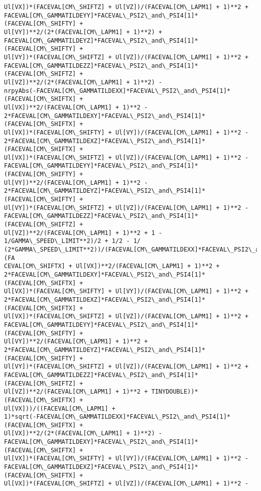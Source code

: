 \documentclass[landscape,letterpaper,10pt,english]{article}
\begin{document}
\begin{Verbatim}[commandchars=\\\{\}]
Ul[VX])*(FACEVAL[CM\_SHIFTZ] + Ul[VZ])/(FACEVAL[CM\_LAPM1] + 1)**2 +
FACEVAL[CM\_GAMMATILDEYY]*FACEVAL\_PSI2\_and\_PSI4[1]*(FACEVAL[CM\_SHIFTY] +
Ul[VY])**2/(2*(FACEVAL[CM\_LAPM1] + 1)**2) +
FACEVAL[CM\_GAMMATILDEYZ]*FACEVAL\_PSI2\_and\_PSI4[1]*(FACEVAL[CM\_SHIFTY] +
Ul[VY])*(FACEVAL[CM\_SHIFTZ] + Ul[VZ])/(FACEVAL[CM\_LAPM1] + 1)**2 +
FACEVAL[CM\_GAMMATILDEZZ]*FACEVAL\_PSI2\_and\_PSI4[1]*(FACEVAL[CM\_SHIFTZ] +
Ul[VZ])**2/(2*(FACEVAL[CM\_LAPM1] + 1)**2) -
nrpyAbs(-FACEVAL[CM\_GAMMATILDEXX]*FACEVAL\_PSI2\_and\_PSI4[1]*(FACEVAL[CM\_SHIFTX] +
Ul[VX])**2/(FACEVAL[CM\_LAPM1] + 1)**2 -
2*FACEVAL[CM\_GAMMATILDEXY]*FACEVAL\_PSI2\_and\_PSI4[1]*(FACEVAL[CM\_SHIFTX] +
Ul[VX])*(FACEVAL[CM\_SHIFTY] + Ul[VY])/(FACEVAL[CM\_LAPM1] + 1)**2 -
2*FACEVAL[CM\_GAMMATILDEXZ]*FACEVAL\_PSI2\_and\_PSI4[1]*(FACEVAL[CM\_SHIFTX] +
Ul[VX])*(FACEVAL[CM\_SHIFTZ] + Ul[VZ])/(FACEVAL[CM\_LAPM1] + 1)**2 -
FACEVAL[CM\_GAMMATILDEYY]*FACEVAL\_PSI2\_and\_PSI4[1]*(FACEVAL[CM\_SHIFTY] +
Ul[VY])**2/(FACEVAL[CM\_LAPM1] + 1)**2 -
2*FACEVAL[CM\_GAMMATILDEYZ]*FACEVAL\_PSI2\_and\_PSI4[1]*(FACEVAL[CM\_SHIFTY] +
Ul[VY])*(FACEVAL[CM\_SHIFTZ] + Ul[VZ])/(FACEVAL[CM\_LAPM1] + 1)**2 -
FACEVAL[CM\_GAMMATILDEZZ]*FACEVAL\_PSI2\_and\_PSI4[1]*(FACEVAL[CM\_SHIFTZ] +
Ul[VZ])**2/(FACEVAL[CM\_LAPM1] + 1)**2 + 1 - 1/GAMMA\_SPEED\_LIMIT**2)/2 + 1/2 - 1/
(2*GAMMA\_SPEED\_LIMIT**2))/(FACEVAL[CM\_GAMMATILDEXX]*FACEVAL\_PSI2\_and\_PSI4[1]*(FA
CEVAL[CM\_SHIFTX] + Ul[VX])**2/(FACEVAL[CM\_LAPM1] + 1)**2 +
2*FACEVAL[CM\_GAMMATILDEXY]*FACEVAL\_PSI2\_and\_PSI4[1]*(FACEVAL[CM\_SHIFTX] +
Ul[VX])*(FACEVAL[CM\_SHIFTY] + Ul[VY])/(FACEVAL[CM\_LAPM1] + 1)**2 +
2*FACEVAL[CM\_GAMMATILDEXZ]*FACEVAL\_PSI2\_and\_PSI4[1]*(FACEVAL[CM\_SHIFTX] +
Ul[VX])*(FACEVAL[CM\_SHIFTZ] + Ul[VZ])/(FACEVAL[CM\_LAPM1] + 1)**2 +
FACEVAL[CM\_GAMMATILDEYY]*FACEVAL\_PSI2\_and\_PSI4[1]*(FACEVAL[CM\_SHIFTY] +
Ul[VY])**2/(FACEVAL[CM\_LAPM1] + 1)**2 +
2*FACEVAL[CM\_GAMMATILDEYZ]*FACEVAL\_PSI2\_and\_PSI4[1]*(FACEVAL[CM\_SHIFTY] +
Ul[VY])*(FACEVAL[CM\_SHIFTZ] + Ul[VZ])/(FACEVAL[CM\_LAPM1] + 1)**2 +
FACEVAL[CM\_GAMMATILDEZZ]*FACEVAL\_PSI2\_and\_PSI4[1]*(FACEVAL[CM\_SHIFTZ] +
Ul[VZ])**2/(FACEVAL[CM\_LAPM1] + 1)**2 + TINYDOUBLE))*(FACEVAL[CM\_SHIFTX] +
Ul[VX]))/((FACEVAL[CM\_LAPM1] +
1)*sqrt(-FACEVAL[CM\_GAMMATILDEXX]*FACEVAL\_PSI2\_and\_PSI4[1]*(FACEVAL[CM\_SHIFTX] +
Ul[VX])**2/(2*(FACEVAL[CM\_LAPM1] + 1)**2) -
FACEVAL[CM\_GAMMATILDEXY]*FACEVAL\_PSI2\_and\_PSI4[1]*(FACEVAL[CM\_SHIFTX] +
Ul[VX])*(FACEVAL[CM\_SHIFTY] + Ul[VY])/(FACEVAL[CM\_LAPM1] + 1)**2 -
FACEVAL[CM\_GAMMATILDEXZ]*FACEVAL\_PSI2\_and\_PSI4[1]*(FACEVAL[CM\_SHIFTX] +
Ul[VX])*(FACEVAL[CM\_SHIFTZ] + Ul[VZ])/(FACEVAL[CM\_LAPM1] + 1)**2 -

\end{Verbatim}
\end{document}
